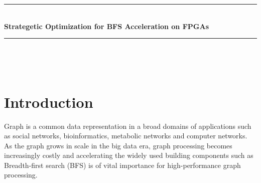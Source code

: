 \documentclass[12pt]{article} %
\begin{document}

\begin{titlepage}

\newcommand{\HRule}{\rule{\linewidth}{0.5mm}} %

\center %

\HRule \\[0.4cm]
{ \huge \bfseries Strategetic Optimization for BFS Acceleration on FPGAs}\\[0.4cm] %
\HRule \\[1.5cm]

\begin{minipage}{0.4\textwidth}
     \\ 
    \vspace{2em}
    \centering {\large \today}
\end{minipage}

\end{titlepage}




\section{Introduction} %
Graph is a common data representation in a broad domains of applications such 
as social networks, bioinformatics, metabolic networks and computer networks. 
As the graph grows in scale in the big data era, graph processing becomes 
increasingly costly and accelerating the widely used building components 
such as Breadth-first search (BFS) is of vital importance for high-performance 
graph processing. 
\end{document}
